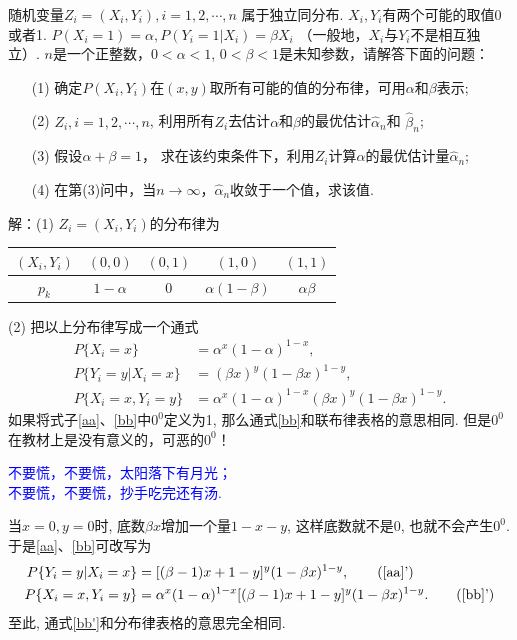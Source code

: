 \begin{example}
	随机变量$Z_i = (X_i, Y_i), i=1, 2,\cdots, n$ 属于独立同分布. $X_i,Y_i$有两个可能的取值0或者1. 
	$P(X_i=1)=\alpha, P(Y_i=1|X_i)=\beta X_i$ （一般地，$X_i$与$Y_i$不是相互独立）.
	$n$是一个正整数，$0<\alpha<1$, $0<\beta<1$是未知参数，请解答下面的问题：
\begin{itemize}
	\item[(1)] 确定$P(X_i, Y_i)$在$(x,y)$取所有可能的值的分布律，可用$\alpha$和$\beta$表示;
	\item[(2)] $Z_i, i=1, 2,\cdots, n$, 利用所有$Z_i$去估计$\alpha$和$\beta$的最优估计$\hat{\alpha}_n$和 $\hat {\beta}_n$;
	\item[(3)] 假设$\alpha + \beta=1$， 求在该约束条件下，利用$Z_i$计算$\alpha$的最优估计量$\hat{\alpha}_n$;
	\item[(4)] 在第(3)问中，当$n\to\infty$，$\hat{\alpha}_n$收敛于一个值，求该值.
\end{itemize}
\end{example}


解：(1) $Z_i=(X_i,Y_i)$的分布律为
\begin{center}
	\begin{tabular}{|c|c|c|c|c|}
		\hline
		$(X_i,Y_i)$	& $(0,0)$ & $(0,1)$ & $(1,0)$ & $(1,1)$\\
		\hline
		$p_k$	& $1-\alpha$ & $0$ & $\alpha(1-\beta)$ & $\alpha\beta$\\
		\hline
	\end{tabular}
\end{center}


(2) 把以上分布律写成一个通式
\begin{subequations}
	\begin{align}
		P\{X_i=x\}&=\alpha^{x}(1-\alpha)^{1-x},\\
		P\{Y_i=y|X_i=x\}&=(\beta x)^{y}(1-\beta x)^{1-y}, \label{aa}\\
		P\{X_i=x,Y_i=y\}&=\alpha^{x}(1-\alpha)^{1-x}(\beta x)^{y}(1-\beta x)^{1-y}.\label{bb}
	\end{align}
\end{subequations}
如果将式子\eqref{aa}、\eqref{bb}中$0^0$定义为1, 那么通式\eqref{bb}和联布律表格的意思相同.
但是$0^0$在教材上是没有意义的，可恶的$0^0$！

\begin{center}
\textcolor{blue}{\hei
不要慌，不要慌，太阳落下有月光；\\
不要慌，不要慌，抄手吃完还有汤.}
\end{center}

当$x=0,y=0$时, 底数$\beta x$增加一个量$1-x-y$, 这样底数就不是$0$, 也就不会产生$0^0$.
于是\eqref{aa}、\eqref{bb}可改写为
\begin{subequations}
	\begin{align}
		P\{Y_i=y|X_i=x\}&=[(\beta-1)x+1-y]^{y}(1-\beta x)^{1-y}, \tag{\ref{aa}'} \label{aa'}\\
		P\{X_i=x,Y_i=y\}&=\alpha^{x}(1-\alpha)^{1-x}[(\beta-1)x+1-y]^{y}(1-\beta x)^{1-y}.\tag{\ref{bb}'}  \label{bb'}
	\end{align}
\end{subequations}
至此, 通式\eqref{bb'}和分布律表格的意思完全相同.

